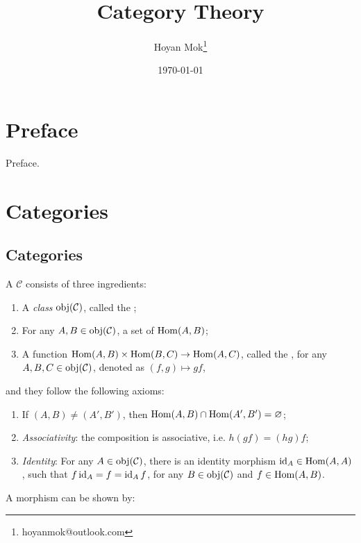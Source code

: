 \documentclass[openany, a5paper]{book}
\title{Category Theory}
\author{%
	Hoyan Mok\thanks{%
		hoyanmok@outlook.com
	}
}
\date{\today} %
\begin{document}
\maketitle %
\frontmatter
\chapter{Preface}
Preface.

\tableofcontents

\mainmatter
\chapter{Categories}
\section{Categories}

\begin{definition}[Category]
	A  $\mathcal C$ consists of three ingredients:
	\begin{enumerate}
		\item A \emph{class} $\operatorname{obj}(\mathcal C)$, called the ;
		\item For any $A, B \in \operatorname{obj}(\mathcal C)$, a set of  $\operatorname{Hom}(A, B)$;
		\item A function $\operatorname{Hom}(A, B) \times \operatorname{Hom}(B, C) \to \operatorname{Hom}(A, C)$, called the , for any $A, B, C \in \operatorname{obj}(\mathcal C)$, denoted as $(f, g) \mapsto gf$, 
	\end{enumerate}
	and they follow the following axioms:
	\begin{enumerate}[label=(\roman*)]
		\item If $(A, B) \neq (A', B')$, then $\operatorname{Hom}(A, B) \cap \operatorname{Hom}(A', B') = \varnothing$;
		\item \emph{Associativity}: the composition is associative, i.e. $h(gf) = (hg)f$;
		\item \emph{Identity}: For any $A \in \operatorname{obj}(\mathcal C)$, there is an identity morphism $\operatorname{id}_A \in \operatorname{Hom}(A, A)$, such that $f \operatorname{id}_A = f = \operatorname{id}_A f$, for any $B \in \operatorname{obj}(\mathcal C)$ and $f \in \operatorname{Hom}(A, B)$.
	\end{enumerate}
\end{definition}

A morphism can be shown by:

\begin{center}\end{center}
\end{document}
